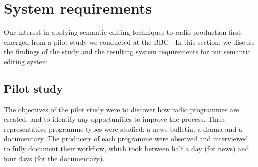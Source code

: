 









\section{System requirements}\label{sec:requirements}
Our interest in applying semantic editing techniques to radio production first emerged from a pilot study we conducted
at the BBC \citep{Baume2015}.  In this section, we discuss the findings of the study and the resulting system
requirements for our semantic editing system.

\subsection{Pilot study}
The objectives of the pilot study were to discover how radio programmes are created, and to identify any opportunities
to improve the process.  Three representative programme types were studied: a news bulletin, a drama and a documentary.
The producers of each programme were observed and interviewed to fully document their workflow, which took between half
a day (for news) and four days (for the documentary).

